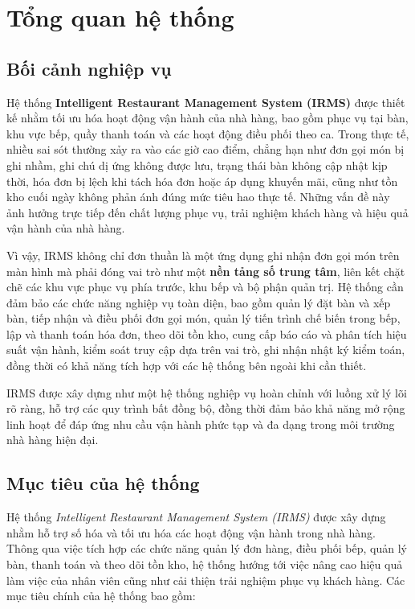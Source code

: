 \section{Tổng quan hệ thống}

\subsection{Bối cảnh nghiệp vụ}

Hệ thống \textbf{Intelligent Restaurant Management System (IRMS)} được thiết kế nhằm tối ưu hóa hoạt động vận hành của nhà hàng, bao gồm phục vụ tại bàn, khu vực bếp, quầy thanh toán và các hoạt động điều phối theo ca. Trong thực tế, nhiều sai sót thường xảy ra vào các giờ cao điểm, chẳng hạn như đơn gọi món bị ghi nhầm, ghi chú dị ứng không được lưu, trạng thái bàn không cập nhật kịp thời, hóa đơn bị lệch khi tách hóa đơn hoặc áp dụng khuyến mãi, cũng như tồn kho cuối ngày không phản ánh đúng mức tiêu hao thực tế. Những vấn đề này ảnh hưởng trực tiếp đến chất lượng phục vụ, trải nghiệm khách hàng và hiệu quả vận hành của nhà hàng.

Vì vậy, IRMS không chỉ đơn thuần là một ứng dụng ghi nhận đơn gọi món trên màn hình mà phải đóng vai trò như một \textbf{nền tảng số trung tâm}, liên kết chặt chẽ các khu vực phục vụ phía trước, khu bếp và bộ phận quản trị. Hệ thống cần đảm bảo các chức năng nghiệp vụ toàn diện, bao gồm quản lý đặt bàn và xếp bàn, tiếp nhận và điều phối đơn gọi món, quản lý tiến trình chế biến trong bếp, lập và thanh toán hóa đơn, theo dõi tồn kho, cung cấp báo cáo và phân tích hiệu suất vận hành, kiểm soát truy cập dựa trên vai trò, ghi nhận nhật ký kiểm toán, đồng thời có khả năng tích hợp với các hệ thống bên ngoài khi cần thiết.  

IRMS được xây dựng như một hệ thống nghiệp vụ hoàn chỉnh với luồng xử lý lõi rõ ràng, hỗ trợ các quy trình bất đồng bộ, đồng thời đảm bảo khả năng mở rộng linh hoạt để đáp ứng nhu cầu vận hành phức tạp và đa dạng trong môi trường nhà hàng hiện đại.
\subsection{Mục tiêu của hệ thống}
Hệ thống \textit{Intelligent Restaurant Management System (IRMS)} được xây dựng nhằm hỗ trợ số hóa và tối ưu hóa các hoạt động vận hành trong nhà hàng. Thông qua việc tích hợp các chức năng quản lý đơn hàng, điều phối bếp, quản lý bàn, thanh toán và theo dõi tồn kho, hệ thống hướng tới việc nâng cao hiệu quả làm việc của nhân viên cũng như cải thiện trải nghiệm phục vụ khách hàng. Các mục tiêu chính của hệ thống bao gồm:

